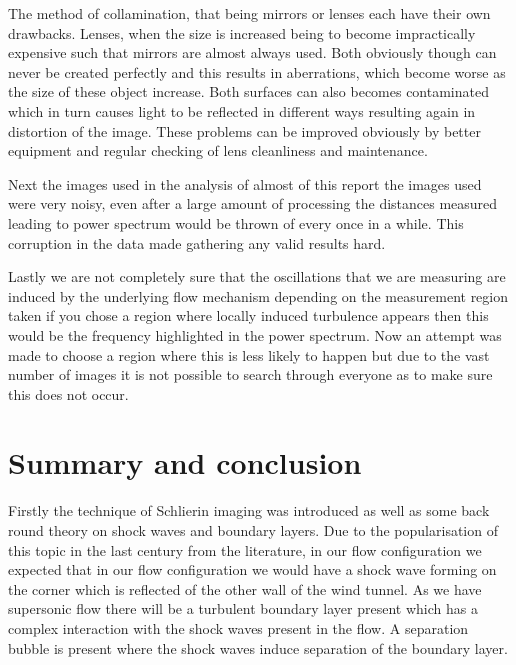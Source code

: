 \documentclass[a4paper,10pt,twoside]{article}
\begin{document}
\begin{multicols}{2}
The method of collamination, that being mirrors or lenses each have their own drawbacks. Lenses, when the size is increased being to become impractically expensive such that mirrors are almost always used. Both obviously though can never be created perfectly and this results in aberrations, which become worse as the size of these object increase. Both surfaces can also becomes contaminated which in turn causes light to be reflected in different ways resulting again in distortion of the image. These problems can be improved obviously by better equipment and regular checking of lens cleanliness and maintenance. \par



Next the images used in the analysis of almost of this report the images used were very noisy, even after a large amount of processing the distances measured leading to power spectrum would be thrown of every once in a while. This corruption in the data made gathering any valid results hard. \par



Lastly we are not completely sure that the oscillations that we are measuring are induced by the underlying flow mechanism depending on the measurement region taken if you chose a region where locally induced turbulence appears then this would be the frequency highlighted in the power spectrum. Now an attempt was made to choose a region where this is less likely to happen but due to the vast number of images it is not possible to search through everyone as to make sure this does not occur. \par 










\section{Summary and conclusion}



Firstly the technique of Schlierin imaging was introduced as well as some back round theory on shock waves and boundary layers. Due to the popularisation of this topic in the last century from the literature, in our flow configuration we expected that in our flow configuration we would have a shock wave forming on the corner which is reflected of the other wall of the wind tunnel. As we have supersonic flow there will be a turbulent boundary layer present which has a complex interaction with the shock waves present in the flow. A separation bubble is present where the shock waves induce separation of the boundary layer.  \par




\end{multicols}
\end{document}

